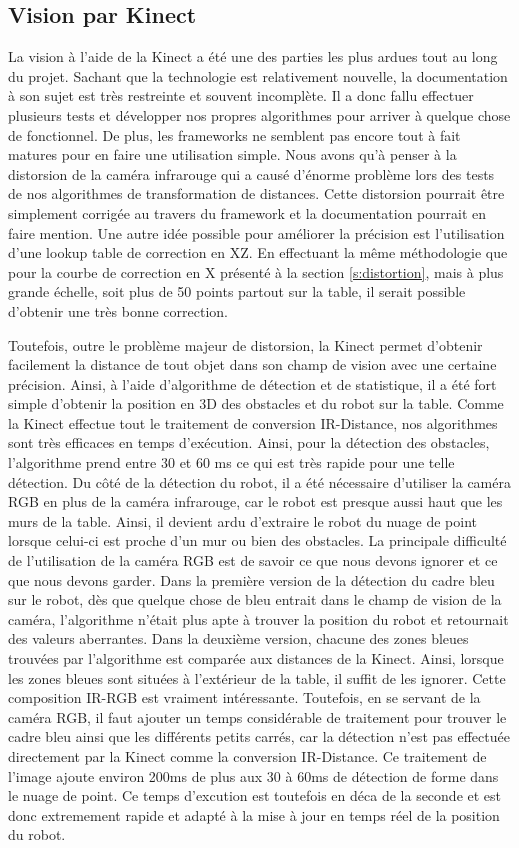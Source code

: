 \subsection{Vision par Kinect}
La vision à l'aide de la Kinect a été une des parties les plus ardues tout au long du projet. Sachant que la technologie est relativement nouvelle, la documentation à son sujet est très restreinte et souvent incomplète. Il a donc fallu effectuer plusieurs tests et développer nos propres algorithmes pour arriver à quelque chose de fonctionnel. De plus, les frameworks ne semblent pas encore tout à fait matures pour en faire une utilisation simple. Nous avons qu'à penser à la distorsion de la caméra infrarouge qui a causé d'énorme problème lors des tests de nos algorithmes de transformation de distances. Cette distorsion pourrait être simplement corrigée au travers du framework et la documentation pourrait en faire mention. Une autre idée possible pour améliorer la précision est l'utilisation d'une lookup table de correction en XZ. En effectuant la même méthodologie que pour la courbe de correction en X présenté à la section \ref{s:distortion}, mais à plus grande échelle, soit plus de 50 points partout sur la table, il serait possible d'obtenir une très bonne correction.

Toutefois, outre le problème majeur de distorsion, la Kinect permet d'obtenir facilement la distance de tout objet dans son champ de vision avec une certaine précision. Ainsi, à l'aide d'algorithme de détection et de statistique, il a été fort simple d'obtenir la position en 3D des obstacles et du robot sur la table. Comme la Kinect effectue tout le traitement de conversion IR-Distance, nos algorithmes sont très efficaces en temps d'exécution. Ainsi, pour la détection des obstacles, l'algorithme prend entre 30 et 60 ms ce qui est très rapide pour une telle détection. Du côté de la détection du robot, il a été nécessaire d'utiliser la caméra RGB en plus de la caméra infrarouge, car le robot est presque aussi haut que les murs de la table. Ainsi, il devient ardu d'extraire le robot du nuage de point lorsque celui-ci est proche d'un mur ou bien des obstacles. La principale difficulté de l'utilisation de la caméra RGB est de savoir ce que nous devons ignorer et ce que nous devons garder. Dans la première version de la détection du cadre bleu sur le robot, dès que quelque chose de bleu entrait dans le champ de vision de la caméra, l'algorithme n'était plus apte à trouver la position du robot et retournait des valeurs aberrantes. Dans la deuxième version, chacune des zones bleues trouvées par l'algorithme est comparée aux distances de la Kinect. Ainsi, lorsque les zones bleues sont situées à l'extérieur de la table, il suffit de les ignorer. Cette composition IR-RGB est vraiment intéressante. Toutefois, en se servant de la caméra RGB, il faut ajouter un temps considérable de traitement pour trouver le cadre bleu ainsi que les différents petits carrés, car la détection n'est pas effectuée directement par la Kinect comme la conversion IR-Distance. Ce traitement de l'image ajoute environ 200ms de plus aux 30 à 60ms de détection de forme dans le nuage de point. Ce temps d'excution est toutefois en déca de la seconde et est donc extremement rapide et adapté à la mise à jour en temps réel de la position du robot.


